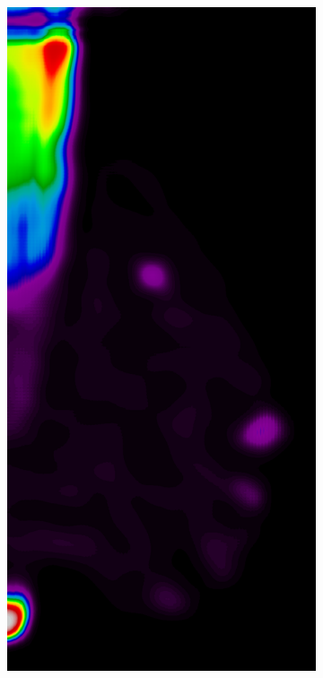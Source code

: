 \documentclass{beamer}
\begin{document}
\begin{frame}
\begin{figure}
\begin{subfigure}{0.134\textwidth}
            \end{subfigure}
            \begin{subfigure}{0.134\textwidth}
	            \centering
		            \includegraphics[width=\textwidth]{plots/examples/example1_probs_3.png}

\end{subfigure}
\end{figure}
\end{frame}
\end{document}
